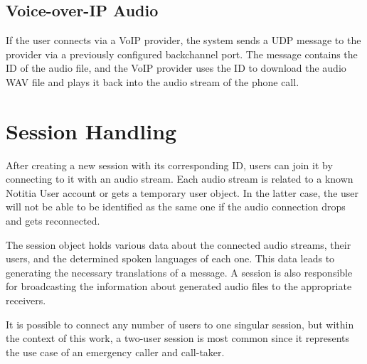 \subsection{Voice-over-IP Audio}
If the user connects via a VoIP provider, the system sends a UDP message to the provider via a previously configured 
backchannel port. The message contains the ID of the audio file, and the VoIP provider uses the ID to download the 
audio WAV file and plays it back into the audio stream of the phone call.


\section{Session Handling}

After creating a new session with its corresponding ID, users can join it by connecting to it with an audio stream. 
Each audio stream is related to a known Notitia User account or gets a temporary user object. In the latter case, the 
user will not be able to be identified as the same one if the audio connection drops and gets reconnected.

The session object holds various data about the connected audio streams, their users, and the determined spoken 
languages of each one.
This data leads to generating the necessary translations of a message.
A session is also responsible for broadcasting the information about generated audio files to the appropriate receivers.

It is possible to connect any number of users to one singular session, but within the context of this work, a two-user 
session is most common since it represents the use case of an emergency caller and call-taker.
